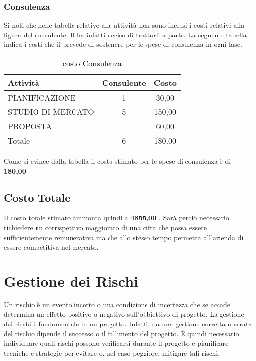 	
\subsubsection{Consulenza}
	
	
Si noti che nelle tabelle relative alle attività non sono inclusi i costi relativi alla figura del consulente. Il  ha infatti deciso di trattarli a parte. La seguente tabella indica i costi che il prevede di sostenere per le spese di consulenza in ogni fase.
	
\clearpage
\begin{table}[!h]
\centering
\begin{tabular}{|l|c|c|}
\hline
\textbf{Attività}& \textbf{Consulente} & \textbf{Costo}  \\ 
              
\hline

PIANIFICAZIONE		& 1& \text{\euro} 30,00 \\
STUDIO DI MERCATO 	& 5& \text{\euro} 150,00 \\
PROPOSTA 			& &	\text{\euro} 60,00 \\	
\hline
Totale				& 6& \text{\euro} 180,00 \\	
\hline
\end{tabular}
\caption{costo Consulenza}\label{tab:consulenza}
\end{table}

Come si evince dalla tabella il costo stimato per le spese di consulenza è di \textbf	{ \text{\euro} 180,00 }	

\subsection{Costo Totale}

Il costo totale stimato ammonta quindi a \textbf	{ \text{\euro} 4855,00 }.
Sarà perciò necessario richiedere un corrispettivo maggiorato di una cifra che possa essere sufficientemente remunerativa ma che allo stesso tempo permetta all'azienda di essere competitiva nel mercato.









\section{Gestione dei Rischi}
Un rischio è un evento incerto o una condizione di incertezza che se accade determina un effetto positivo o negativo sull'obbiettivo di progetto.
La gestione dei rischi è fondamentale in un progetto. Infatti, da una gestione corretta o errata del rischio dipende il successo o il fallimento del progetto.
È quindi necessario individuare quali rischi possono verificarsi durante il progetto e pianificare tecniche e strategie per evitare o, nel caso peggiore, mitigare tali rischi.

